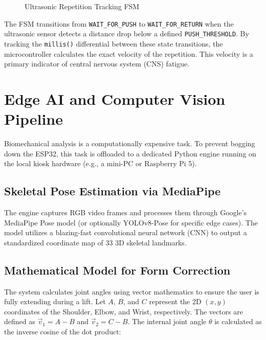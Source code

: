 \documentclass[conference]{IEEEtran}
\begin{document}
\begin{figure}[h!]
\centering
{}
\caption{Ultrasonic Repetition Tracking FSM}
\label{fig:fsm}
\end{figure}

The FSM transitions from \texttt{WAIT\_FOR\_PUSH} to \texttt{WAIT\_FOR\_RETURN} when the ultrasonic sensor detects a distance drop below a defined \texttt{PUSH\_THRESHOLD}. 
By tracking the \texttt{millis()} differential between these state transitions, the microcontroller calculates the exact velocity of the repetition. This velocity is a primary indicator of central nervous system (CNS) fatigue.

\section{Edge AI and Computer Vision Pipeline}
Biomechanical analysis is a computationally expensive task. To prevent bogging down the ESP32, this task is offloaded to a dedicated Python engine running on the local kiosk hardware (e.g., a mini-PC or Raspberry Pi 5).

\subsection{Skeletal Pose Estimation via MediaPipe}
The engine captures RGB video frames and processes them through Google's MediaPipe Pose model (or optionally YOLOv8-Pose for specific edge cases). The model utilizes a blazing-fast convolutional neural network (CNN) to output a standardized coordinate map of 33 3D skeletal landmarks.

\subsection{Mathematical Model for Form Correction}
The system calculates joint angles using vector mathematics to ensure the user is fully extending during a lift. Let $A$, $B$, and $C$ represent the 2D $(x,y)$ coordinates of the Shoulder, Elbow, and Wrist, respectively. The vectors are defined as $\vec{v}_1 = A - B$ and $\vec{v}_2 = C - B$. The internal joint angle $\theta$ is calculated as the inverse cosine of the dot product:
\end{document}
